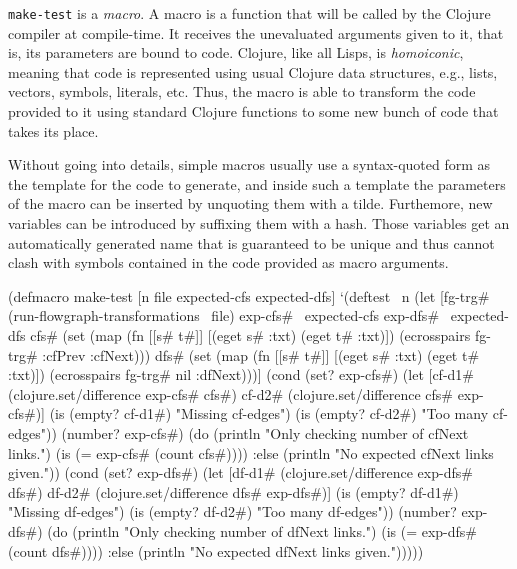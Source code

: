 \documentclass[11pt]{article}
\begin{document}
\verb|make-test| is a \emph{macro}.  A macro is a function that will be called
by the Clojure compiler at compile-time.  It receives the unevaluated arguments
given to it, that is, its parameters are bound to code.  Clojure, like all
Lisps, is \emph{homoiconic}, meaning that code is represented using usual
Clojure data structures, e.g., lists, vectors, symbols, literals, etc.  Thus,
the macro is able to transform the code provided to it using standard Clojure
functions to some new bunch of code that takes its place.

Without going into details, simple macros usually use a syntax-quoted form as
the template for the code to generate, and inside such a template the
parameters of the macro can be inserted by unquoting them with a tilde.
Furthemore, new variables can be introduced by suffixing them with a hash.
Those variables get an automatically generated name that is guaranteed to be
unique and thus cannot clash with symbols contained in the code provided as
macro arguments.

\begin{clojurecode}
(defmacro make-test [n file expected-cfs expected-dfs]
  `(deftest ~n
     (let [fg-trg# (run-flowgraph-transformations ~file)
           exp-cfs# ~expected-cfs
           exp-dfs# ~expected-dfs
           cfs# (set (map (fn [[s# t#]] [(eget s# :txt) (eget t# :txt)])
                          (ecrosspairs fg-trg# :cfPrev :cfNext)))
           dfs# (set (map (fn [[s# t#]] [(eget s# :txt) (eget t# :txt)])
                          (ecrosspairs fg-trg# nil :dfNext)))]
       (cond
        (set? exp-cfs#) (let [cf-d1# (clojure.set/difference exp-cfs# cfs#)
                              cf-d2# (clojure.set/difference cfs# exp-cfs#)]
                          (is (empty? cf-d1#) "Missing cf-edges")
                          (is (empty? cf-d2#) "Too many cf-edges"))
        (number? exp-cfs#) (do
                             (println "Only checking number of cfNext links.")
                             (is (= exp-cfs# (count cfs#))))
        :else (println "No expected cfNext links given."))
       (cond
        (set? exp-dfs#) (let [df-d1# (clojure.set/difference exp-dfs# dfs#)
                              df-d2# (clojure.set/difference dfs# exp-dfs#)]
                          (is (empty? df-d1#) "Missing df-edges")
                          (is (empty? df-d2#) "Too many df-edges"))
        (number? exp-dfs#) (do
                             (println "Only checking number of dfNext links.")
                             (is (= exp-dfs# (count dfs#))))
        :else (println "No expected dfNext links given.")))))
\end{clojurecode}
\end{document}
